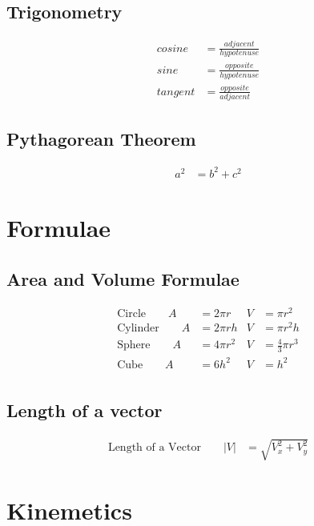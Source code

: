 \documentclass[]{article}
\begin{document}
\subsection{Trigonometry}

\begin{align*}
	cosine &= \frac{adjacent}{hypotenuse} \\
	sine &= \frac{opposite}{hypotenuse} \\
	tangent &= \frac{opposite}{adjacent}
\end{align*}

\subsection{Pythagorean Theorem}

\begin{align*}
	a^2 &= b^2 +c^2
\end{align*} 

\newpage


\section{Formulae}

\subsection{Area and Volume Formulae}

\begin{align*}
	\text{Circle} \qquad  A &= 2 \pi r  & V &= \pi r^2 \\
	\text{Cylinder} \qquad  A &= 2 \pi r h &  V &= \pi r^2 h \\
	\text{Sphere} \qquad  A &= 4 \pi r^2 &  V &= \frac{4}{3} \pi r^3 \\
	\text{Cube} \qquad  A &= 6 h^2 &  V &= h^2 \\
\end{align*} 

\subsection{Length of a vector}

\begin{align*}
	\text{Length of a Vector} \qquad \left|  V \right| &= \sqrt{V^2_x + V^2_y}
\end{align*}

\newpage



\section{Kinemetics}
\end{document}
